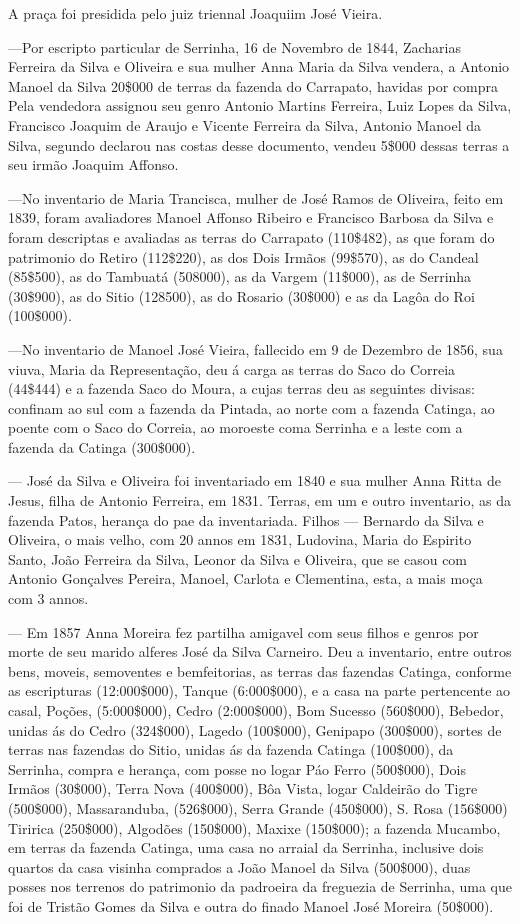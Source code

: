 A praça foi presidida pelo juiz triennal Joaquiim José Vieira.

—Por escripto particular de Serrinha, 16 de Novembro de 1844, Zacharias Ferreira da Silva e Oliveira e sua mulher Anna Maria da Silva vendera, a Antonio Manoel da Silva 20\$000 de terras da fazenda do Carrapato, havidas por compra Pela vendedora assignou seu genro Antonio Martins Ferreira, Luiz Lopes da Silva, Francisco Joaquim de Araujo e Vicente Ferreira da Silva, Antonio Manoel da Silva, segundo declarou nas costas desse documento, vendeu 5\$000 dessas terras a seu irmão Joaquim Affonso.

—No inventario de Maria Trancisca, mulher de José Ramos de Oliveira, feito em 1839, foram avaliadores Manoel Affonso Ribeiro e Francisco Barbosa da Silva e foram descriptas e avaliadas as terras do Carrapato (110\$482), as que foram do patrimonio do Retiro (112\$220), as dos Dois Irmãos (99\$570), as do Candeal (85\$500), as do Tambuatá (508000), as da Vargem (11\$000), as de Serrinha (30\$900), as do Sitio (128500), as do Rosario (30\$000) e as da Lagôa do Roi (100\$000).


—No inventario de Manoel José Vieira, fallecido em 9 de Dezembro de 1856, sua viuva, Maria da Representação, deu á carga as
terras do Saco do Correia (44\$444) e a fazenda Saco do Moura, a cujas terras deu as seguintes divisas: confinam ao sul com a fazenda da Pintada, ao norte com a fazenda Catinga, ao poente com o Saco do Correia, ao moroeste coma Serrinha e a leste com a fazenda da Catinga (300\$000).

— José da Silva e Oliveira foi inventariado em 1840 e sua mulher Anna Ritta de Jesus, filha de Antonio Ferreira, em 1831. Terras, em um e outro inventario, as da fazenda Patos, herança do pae da inventariada. Filhos — Bernardo da Silva e Oliveira, o mais velho, com 20 annos em 1831, Ludovina, Maria do Espirito Santo, João Ferreira da Silva, Leonor da Silva e Oliveira, que se casou com Antonio Gonçalves Pereira, Manoel, Carlota e Clementina, esta, a mais moça com 3 annos.

— Em 1857 Anna Moreira fez partilha amigavel com seus filhos e genros por morte de seu marido alferes José da Silva Carneiro. Deu a inventario, entre outros bens, moveis, semoventes e bemfeitorias, as terras das fazendas Catinga, conforme as escripturas (12:000\$000), Tanque (6:000\$000), e a casa na parte pertencente ao casal, Poções, (5:000\$000), Cedro (2:000\$000), Bom Sucesso (560\$000), Bebedor, unidas ás do Cedro (324\$000), Lagedo (100\$000), Genipapo (300\$000), sortes de terras nas fazendas do Sitio, unidas  ás da fazenda Catinga (100\$000), da Serrinha, compra e herança, com posse no logar Páo Ferro (500\$000), Dois Irmãos (30\$000), Terra Nova (400\$000), Bôa Vista, logar Caldeirão do Tigre (500\$000), Massaranduba, (526\$000), Serra Grande (450\$000), S. Rosa (156\$000) Tiririca (250\$000), Algodões (150\$000), Maxixe (150\$000); a fazenda Mucambo, em terras da fazenda Catinga, uma casa no arraial da Serrinha, inclusive dois quartos da casa visinha comprados a João Manoel da Silva (500\$000), duas posses nos terrenos do patrimonio da padroeira da freguezia de Serrinha, uma que foi de Tristão Gomes da Silva e outra do finado Manoel José Moreira (50\$000).

